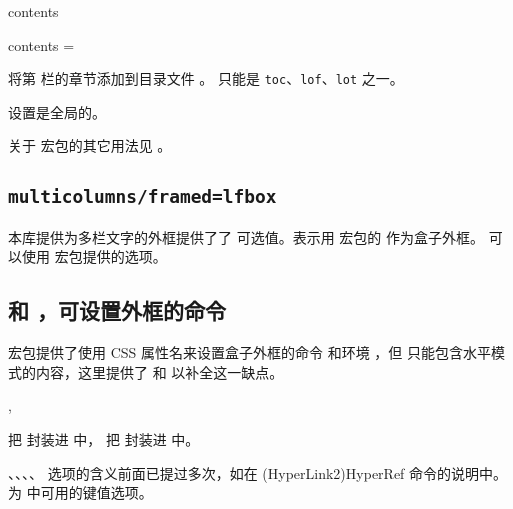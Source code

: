 \documentclass{cusdoc}
\begin{document}
\begin{keyval}[path=paracol]{contents}
  \begin{syntax}
    contents =  
  \end{syntax}
  将第  栏的章节添加到目录文件 。 只能是 \texttt{toc}、\texttt{lof}、\texttt{lot} 之一。

  设置是全局的。
\end{keyval}

关于  宏包的其它用法见 。

\subsection{\texttt{multicolumns/framed=lfbox}}\label{sec:multicolumns/framed=lfbox}

本库提供为多栏文字的外框提供了了  可选值。表示用  宏包的 
 作为盒子外框。 可以使用  
宏包提供的选项。

\subsection{ 和 ，可设置外框的命令}
\label{sec:fparbox-fvarbox}

 宏包提供了使用 CSS 属性名来设置盒子外框的命令  和环境 ，但  只能包含水平模式的内容，这里提供了  和  以补全这一缺点。

\begin{function}{\fparbox,\fvarbox}
  \begin{syntax}
    \V\fparbox {} 
    \V\fparbox {}     
    \V\fvarbox {} 
    \V\fvarbox {}     
  \end{syntax}

 把  封装进  中， 把  封装进  中。

、、、、 选项的含义前面已提过多次，如在 \csref(HyperLink2){HyperRef} 命令的说明中。 为  中可用的键值选项。
\end{function}
\end{document}

